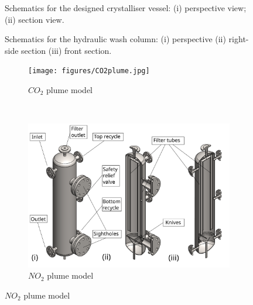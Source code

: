 \begin{figure}[h]
    \centering
    
    \caption{Schematics for the designed crystalliser vessel: (i) perspective view; (ii) section view.}
    \label{fig:crystalliser schematic executive}
\end{figure}

\begin{figure}[h]
    \centering
    
    \caption{Schematics for the hydraulic wash column: (i) perspective (ii) right-side section (iii) front section.}
    \label{fig:wash column schematic executive}
\end{figure}

\begin{figure}[t!]
    \centering
    \begin{subfigure}[t]{0.5\textwidth}
        \centering
        \texttt{[image: figures/CO2plume.jpg]}
        \caption{$CO_2$ plume model}
    \end{subfigure}%
    ~ 
    \begin{subfigure}[t]{0.5\textwidth}
        \centering
        \includegraphics[width=\linewidth]{chapters/3-separation/figures/Wash_column_schematic_executive.svg}
        \caption{$NO_2$ plume model}
    \end{subfigure}
\end{figure}